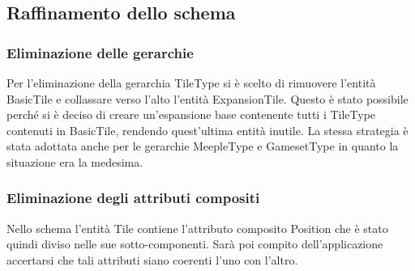 \subsection{Raffinamento dello schema}
\subsubsection*{Eliminazione delle gerarchie}
Per l'eliminazione della gerarchia TileType si è scelto di rimuovere l'entità BasicTile e collassare verso l'alto l'entità ExpansionTile. Questo è stato possibile perché si è deciso di creare un'espansione base contenente tutti i TileType contenuti in BasicTile, rendendo quest'ultima entità inutile. La stessa strategia è stata adottata anche per le gerarchie MeepleType e GamesetType in quanto la situazione era la medesima.
\medskip

\subsubsection*{Eliminazione degli attributi compositi}
Nello schema l'entità Tile contiene l'attributo composito Position che è stato quindi diviso nelle sue sotto-componenti. Sarà poi compito dell'applicazione accertarsi che tali attributi siano coerenti l'uno con l'altro.
\medskip

